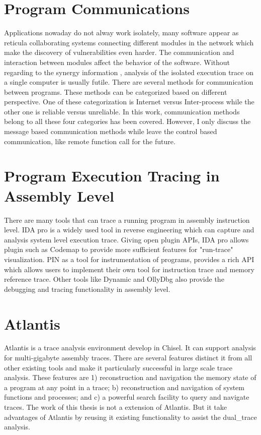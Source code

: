 \section{Program Communications}
Applications nowaday do not alway work isolately,  many software  appear as  reticula collaborating systems connecting different modules in the network\cite{PhysRevE.68.046116} which make the discovery of vulnerabilities even harder. The communication and interaction between modules affect the behavior of the software. Without regarding to the synergy information , analysis of the isolated execution trace on a single computer is usually futile. There are several methods for communication between programs. These methods can be categorized based on different perspective. One of these categorization is Internet versus Inter-process while the other one is reliable versus unreliable. In this work, communication methods belong to all these four categories has been covered. However, I only discuss the message based communication methods while leave the control based communication, like remote function call for the future.

\section{Program Execution Tracing in Assembly Level}
There are many tools that can trace a running program in assembly instruction level.  IDA pro \cite{eagle_ida_2008} is a widely used tool in reverse engineering which can capture and analysis system level execution trace. Giving open plugin APIs, IDA pro allows plugin such as Codemap \cite{_c0demap/codemap:_????} to provide more sufficient features for "run-trace" visualization. PIN\cite{_pin_????} as a tool for instrumentation of programs, provides a rich API which allows users to implement their own tool for instruction trace and memory reference trace. Other tools like Dynamic \cite{brueningqz} and OllyDbg\cite{yuschuk2007ollydbg} also provide the debugging and tracing functionality in assembly level. 

\section{Atlantis}
Atlantis is a trace analysis environment develop in Chisel. It can support analysis for multi-gigabyte assembly traces. There are several features distinct it from all other existing tools and make it particularly successful in large scale trace analysis. These features are 1) reconstruction and navigation the memory state of a program at any point in a trace; b) reconstruction and navigation of system functions and processes; and c) a powerful search facility to query and navigate traces. The work of this thesis is not a extension of Atlantis. But it take advantages of Atlantis by reusing it existing functionality to assist the dual\_trace analysis.




